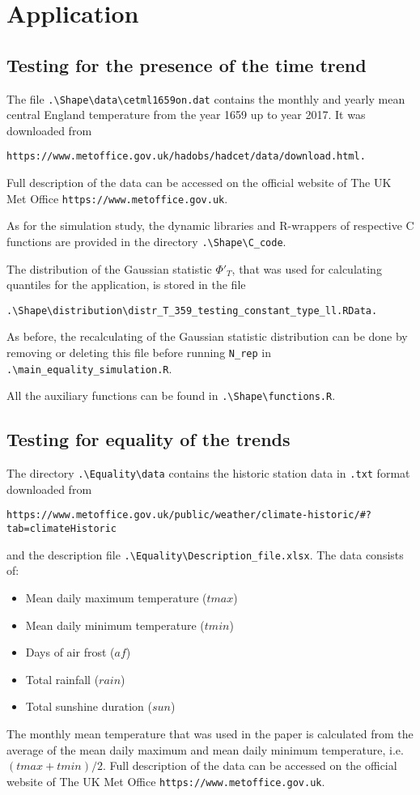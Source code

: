 \documentclass[a4paper,12pt]{article}
\begin{document}
\section{Application}
\subsection{Testing for the presence of the time trend}

The file \verb|.\Shape\data\cetml1659on.dat| contains the monthly and yearly mean central England temperature from the year 1659 up to year 2017. It was downloaded from 
\begin{verbatim}
https://www.metoffice.gov.uk/hadobs/hadcet/data/download.html.
\end{verbatim}
Full description of the data can be accessed on the official website of The UK Met Office \verb|https://www.metoffice.gov.uk|. 


As for the simulation study, the dynamic libraries and R-wrappers of respective C functions are provided in the directory \verb|.\Shape\C_code|. 


The distribution of the Gaussian statistic $\Phi'_T$, that was used for calculating quantiles for the application, is stored in the file
\begin{verbatim}
.\Shape\distribution\distr_T_359_testing_constant_type_ll.RData.
\end{verbatim} 
As before, the recalculating of the Gaussian statistic distribution can be done by removing or deleting this file before running \verb|N_rep| in \verb|.\main_equality_simulation.R|.  

All the auxiliary functions can be found in \verb|.\Shape\functions.R|.


\subsection{Testing for equality of the trends}
The directory \verb|.\Equality\data| contains the historic station data in \verb|.txt| format downloaded from 
\begin{verbatim}
https://www.metoffice.gov.uk/public/weather/climate-historic/#?tab=climateHistoric
\end{verbatim}
and the description file \verb|.\Equality\Description_file.xlsx|. The data consists of:
\begin{itemize}
\item Mean daily maximum temperature ($tmax$)
\item Mean daily minimum temperature ($tmin$)
\item Days of air frost ($af$)
\item Total rainfall ($rain$)
\item Total sunshine duration ($sun$)
\end{itemize}
The monthly mean temperature that was used in the paper is calculated from the average of the mean daily maximum and mean daily minimum temperature, i.e.\ $(tmax+tmin)/2$. Full description of the data can be accessed on the official website of The UK Met Office \verb|https://www.metoffice.gov.uk|. 
\end{document}
